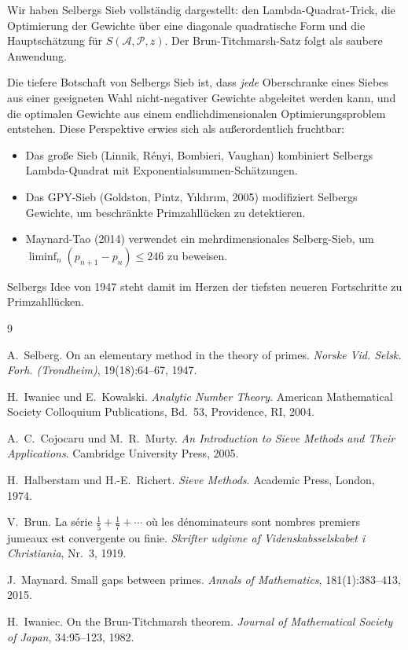 \documentclass[12pt,a4paper]{amsart}
\theoremstyle{definition}
\begin{document}
Wir haben Selbergs Sieb vollständig dargestellt: den Lambda-Quadrat-Trick,
die Optimierung der Gewichte über eine diagonale quadratische Form und die
Hauptschätzung für $S(\mathcal{A},\mathcal{P},z)$.  Der Brun-Titchmarsh-Satz
folgt als saubere Anwendung.

Die tiefere Botschaft von Selbergs Sieb ist, dass \emph{jede} Oberschranke eines
Siebes aus einer geeigneten Wahl nicht-negativer Gewichte abgeleitet werden kann,
und die optimalen Gewichte aus einem endlichdimensionalen Optimierungsproblem
entstehen.  Diese Perspektive erwies sich als außerordentlich fruchtbar:
\begin{itemize}
  \item Das große Sieb (Linnik, Rényi, Bombieri, Vaughan) kombiniert Selbergs
    Lambda-Quadrat mit Exponentialsummen-Schätzungen.
  \item Das GPY-Sieb (Goldston, Pintz, Y{\i}ld{\i}r{\i}m, 2005) modifiziert
    Selbergs Gewichte, um beschränkte Primzahllücken zu detektieren.
  \item Maynard-Tao (2014) verwendet ein mehrdimensionales Selberg-Sieb, um
    $\liminf_n (p_{n+1} - p_n) \leq 246$ zu beweisen.
\end{itemize}

Selbergs Idee von 1947 steht damit im Herzen der tiefsten neueren Fortschritte
zu Primzahllücken.

\begin{thebibliography}{9}

A.~Selberg.
\newblock On an elementary method in the theory of primes.
\newblock \emph{Norske Vid. Selsk. Forh. (Trondheim)}, 19(18):64--67, 1947.

H.~Iwaniec und E.~Kowalski.
\newblock \emph{Analytic Number Theory}.
\newblock American Mathematical Society Colloquium Publications, Bd.~53,
  Providence, RI, 2004.

A.~C.~Cojocaru und M.~R.~Murty.
\newblock \emph{An Introduction to Sieve Methods and Their Applications}.
\newblock Cambridge University Press, 2005.

H.~Halberstam und H.-E.~Richert.
\newblock \emph{Sieve Methods}.
\newblock Academic Press, London, 1974.

V.~Brun.
\newblock La s{\'e}rie $\frac{1}{5}+\frac{1}{7}+\cdots$ o\`u les d{\'e}nominateurs
  sont nombres premiers jumeaux est convergente ou finie.
\newblock \emph{Skrifter udgivne af Videnskabsselskabet i Christiania}, Nr.~3, 1919.

J.~Maynard.
\newblock Small gaps between primes.
\newblock \emph{Annals of Mathematics}, 181(1):383--413, 2015.

H.~Iwaniec.
\newblock On the Brun-Titchmarsh theorem.
\newblock \emph{Journal of Mathematical Society of Japan}, 34:95--123, 1982.

\end{thebibliography}
\end{document}
